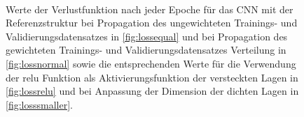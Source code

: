 \setcounter{subfigure}{0}
\begin{figure}
 \centering
  \begin{subfigure}[Ungewichteter Datensatz]{
 \texttt{[image: fig/Appendix\_CNN/losshistoryequal.pdf]} \label{fig:lossequal}}
  \end{subfigure}
 \begin{subfigure}[Gewichteter Datensatz]{
 \texttt{[image: fig/Appendix\_CNN/losshistorynormal.pdf]}\label{fig:lossnormal}}
  \end{subfigure} \\
  \begin{subfigure}[relu statt elu als Aktivierungsfunktion]{
 \texttt{[image: fig/Appendix\_CNN/losshistoryrelu.pdf]}\label{fig:lossrelu}}
  \end{subfigure}
 \begin{subfigure}[Verkleinerte Dimensionen der dichten Lagen]{
 \texttt{[image: fig/Appendix\_CNN/losshistorysmaller.pdf]}\label{fig:losssmaller}}
  \end{subfigure}
  \caption{Werte der Verlustfunktion nach jeder Epoche für das CNN mit der Referenzstruktur bei Propagation des ungewichteten Trainings- und Validierungsdatensatzes in \ref{fig:lossequal} und bei Propagation des gewichteten Trainings- und Validierungsdatensatzes Verteilung in \ref{fig:lossnormal} sowie die entsprechenden Werte für die Verwendung der relu Funktion als Aktivierungsfunktion der versteckten Lagen in \ref{fig:lossrelu} und bei Anpassung der Dimension der dichten Lagen in \ref{fig:losssmaller}.}
\end{figure}
\setcounter{subfigure}{0}



